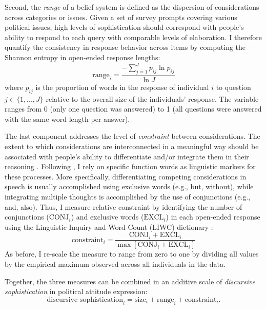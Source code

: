 Second, the \textit{range} of a belief system is defined as the dispersion of considerations across categories or issues. Given a set of survey prompts covering various political issues, high levels of sophistication should correspond with people's ability to respond to each query with comparable levels of elaboration. I therefore quantify the consistency in response behavior across items by computing the Shannon entropy in open-ended response lengths:
\begin{equation}
\text{range}_i = \dfrac{-\sum_{j=1}^J p_{ij} \ln p_{ij}}{\ln J}
\end{equation}
where $p_{ij}$ is the proportion of words in the response of individual $i$ to question $j\in \{1,...,J\}$ relative to the overall size of the individuals' response. The variable ranges from 0 (only one question was answered) to 1 (all questions were answered with the same word length per answer).

The last component addresses the level of \textit{constraint} between considerations. The extent to which considerations are interconnected in a meaningful way should be associated with people's ability to differentiate and/or integrate them in their reasoning \citep{tetlock1993cognitive}. Following \citet{tausczik2010psychological}, I rely on specific function words as linguistic markers for these processes. More specifically, differentiating competing considerations in speech is usually accomplished using exclusive words (e.g., but, without), while integrating multiple thoughts is accomplished by the use of conjunctions (e.g., and, also). Thus, I measure relative constraint by identifying the number of conjunctions ($\text{CONJ}_i$) and exclusive words ($\text{EXCL}_i$) in each open-ended response using the Linguistic Inquiry and Word Count (LIWC) dictionary \citep{pennebaker2015development}:
\begin{equation}
\text{constraint}_i = \dfrac{\text{CONJ}_i + \text{EXCL}_i}{\max\left[\text{CONJ}_i + \text{EXCL}_i\right]}
\end{equation}
As before, I re-scale the measure to range from zero to one by dividing all values by the empirical maximum observed across all individuals in the data.

Together, the three measures can be combined in an additive scale of \textit{discursive sophistication} in political attitude expression:
\begin{equation}
\text{discursive sophistication}_i = \text{size}_i + \text{range}_i + \text{constraint}_i.
\end{equation}

